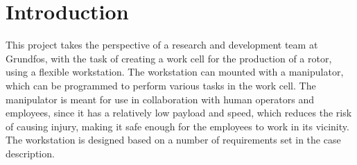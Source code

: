 \chapter{Introduction} \label{ch:introduction}

This project takes the perspective of a research and development team at Grundfos, with the task of creating a work cell for the production of a rotor, using a flexible workstation. The workstation can mounted with a manipulator, which can be programmed to perform various tasks in the work cell. The manipulator is meant for use in collaboration with human operators and employees, since it has a relatively low payload and speed, which reduces the risk of causing injury, making it safe enough for the employees to work in its vicinity. The workstation is designed based on a number of requirements set in the case description.\\


